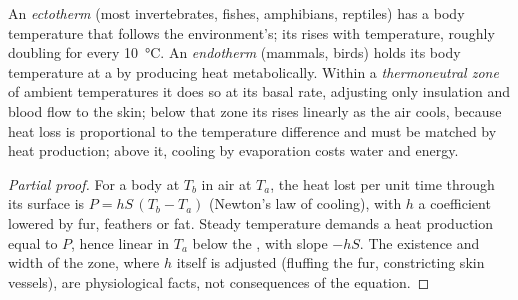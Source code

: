 \begin{proposition}\label{prop:b1:organism-environment:thermo}
An \emph{ectotherm} (most invertebrates, fishes,
amphibians, reptiles) has a body temperature that follows the
environment's; its  rises with temperature, roughly
doubling for every \qty{10}{\celsius}. An \emph{endotherm}
(mammals, birds) holds its body temperature at a  by
producing heat metabolically. Within a \emph{thermoneutral
zone} of ambient temperatures it does so at
its basal rate, adjusting only insulation and blood flow to the skin;
below that zone its  rises linearly as the air cools,
because heat loss is proportional to the temperature difference and must
be matched by heat production; above it, cooling by evaporation costs
water and energy.
\end{proposition}
\begin{proof}[Partial proof]
For a body at $T_b$ in air at $T_a$, the heat lost per unit time through
its surface is $P = hS\,(T_b - T_a)$ (Newton's law of cooling), with $h$
a coefficient lowered by fur, feathers or fat. Steady temperature demands
a heat production equal to $P$, hence linear in $T_a$ below the
, with slope $-hS$. The existence and width of the
zone, where $h$ itself is adjusted (fluffing the fur, constricting skin
vessels), are physiological facts, not consequences of the equation.
\end{proof}

